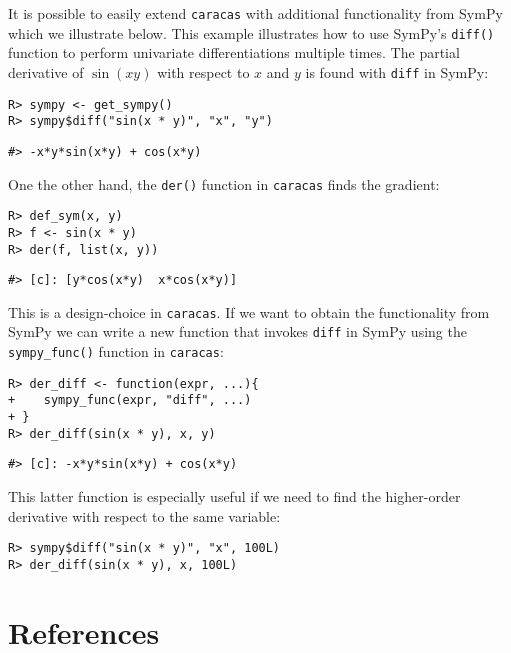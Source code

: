 It is possible to easily extend \texttt{caracas} with additional
functionality from SymPy which we illustrate below. This example
illustrates how to use SymPy's \texttt{diff()} function to perform univariate
differentiations multiple times. The partial derivative of \(\sin(xy)\)
with respect to \(x\) and \(y\) is found with \texttt{diff} in SymPy:

\begin{verbatim}
R> sympy <- get_sympy()
R> sympy$diff("sin(x * y)", "x", "y")
\end{verbatim}

\begin{verbatim}
#> -x*y*sin(x*y) + cos(x*y)
\end{verbatim}

One the other hand, the \texttt{der()} function in \texttt{caracas} finds the gradient:

\begin{verbatim}
R> def_sym(x, y)
R> f <- sin(x * y) 
R> der(f, list(x, y))
\end{verbatim}

\begin{verbatim}
#> [c]: [y*cos(x*y)  x*cos(x*y)]
\end{verbatim}

This is a design-choice in \texttt{caracas}. If we want to obtain
the functionality from SymPy
we can write a new function that invokes \texttt{diff} in SymPy using the
\texttt{sympy\_func()} function in \texttt{caracas}:

\begin{verbatim}
R> der_diff <- function(expr, ...){
+    sympy_func(expr, "diff", ...)
+ }
R> der_diff(sin(x * y), x, y)
\end{verbatim}

\begin{verbatim}
#> [c]: -x*y*sin(x*y) + cos(x*y)
\end{verbatim}

This latter function is especially useful if we need to find the higher-order
derivative with respect to the same variable:

\begin{verbatim}
R> sympy$diff("sin(x * y)", "x", 100L)
R> der_diff(sin(x * y), x, 100L)
\end{verbatim}

\hypertarget{references}{%
\section*{References}\label{references}}

